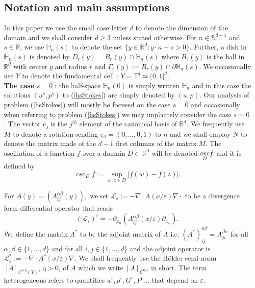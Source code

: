 \documentclass[11pt, reqno]{amsart}
\theoremstyle{definition}
\theoremstyle{remark}
\numberwithin{equation}{section}
\DeclareMathOperator*{\osc}{osc}
\begin{document}
	\subsection{Notation and main assumptions}
	
	
	\noindent In this paper we use the small case letter $d$ to denote the dimension of the domain and we shall consider $d\geq3$ unless stated otherwise.	For $n\in\mathbb{S}^{d-1}$ and $s\in \mathbb{R}$, we use  $\mathbb{H}_n(s)$ to denote the set $\{ y\in\mathbb{R}^d: y\cdot n 
	-s>0 \}$. Further, a disk in $\mathbb{H}_n(s)$ is denoted by $D_r(y)=B_r(y)\cap \mathbb{H}_n(s)$ where $B_r(y)$ is the ball in $\mathbb{R}^d$ with center $y$ and radius $r$ and $\Gamma_r(y):=B_r(y)\cap \partial\mathbb{H}_n(s)$.	
		We occasionally use  $Y$ to denote the fundamental  cell : $Y=\mathbb{T}^d\simeq(0,1]^d.$\\
	{\bf The case $s=0$} : the half-space  $\mathbb{H}_n(0)$ is simply written  $\mathbb{H}_n$ and in this case the solutions $(u^s, p^s)$ to (\ref{hsStokes}) are simply denoted by $(u, p)$. Our analysis of problem (\ref{hsStokes}) will mostly  be focused on the case $s=0$ and occasionally when referring to problem (\ref{hsStokes}) we may implicitely consider the case $s=0$.  	The vector $e_j$ is the $j^{th}$ element of the canonical basis of $\mathbb{R}^d$.
	\noindent We frequently use $M$ to denote a rotation sending $e_d=(0, ...,0,1)$ to $n$	and we shall employ $N$ to denote the matrix made of the $d-1$ first columns of the matrix $M$.
	The oscillation of a function $f$ over a domain $D\subset \mathbb{R}^d$ will be denoted 
	$\underset{D}{\textup{osc}} f$ and it is defined by $$\osc_D f := \sup_{w,z \in D} |f(w) -f(z)|.$$
	
	\noindent For $A(y)=(A^{\alpha\beta}_{ij}(y)),$ we set $\mathcal{L}_\varepsilon := -\nabla\cdot A (x/\varepsilon) \nabla\cdot  $  to be a divergence form differential operator that  reads
	$$( \mathcal{L}_\varepsilon )^i=-\partial_{x_{\alpha}}\left( A^{\alpha\beta}_{ij}(x/\varepsilon) \partial_{x_{\beta}}  \right).$$
	We define the matrix $A^*$ to be the adjoint matrix of $A$ i.e. $(A^*)^{\alpha\beta}_{ij}=A^{\beta\alpha}_{ji}$ for all $\alpha,\beta\in\{ 1,..., d\} $ and for all $i,j\in\{ 1,..., d\} $ and the adjoint operator is  $\mathcal{L}^*_\varepsilon := -\nabla\cdot A^* (x/\varepsilon) \nabla $. We shall frequently use the H\"older semi-norm $[A]_{C^{0,\eta}(Y)}$, $\eta>0$,	of $A$ which we write  $[A]_{C^{0,\eta}}$ in short.
	The term heterogeneous refers to quantities $u^\varepsilon, p^\varepsilon, G^\varepsilon, P^\varepsilon ...$ that depend on $\varepsilon$.\\
	
\end{document}
